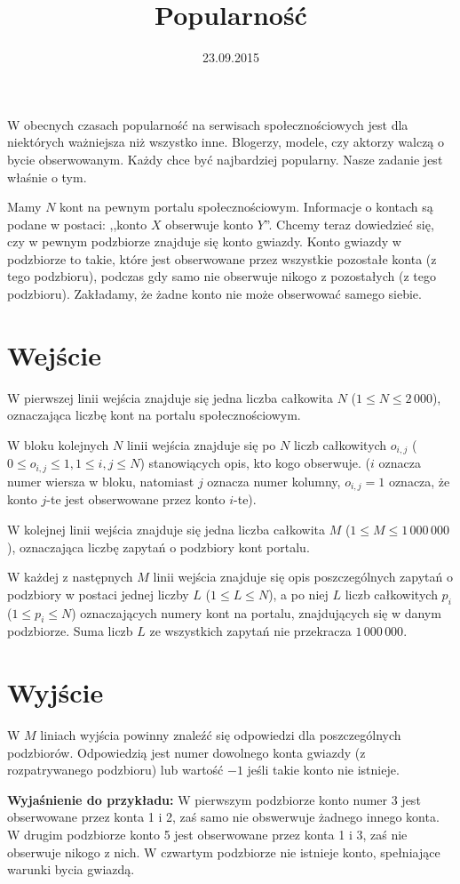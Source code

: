 \documentclass[zad,zawodnik,utf8]{sinol}
\title{Popularność}
\author{}
\date{23.09.2015}
\begin{document}
  \begin{tasktext}%
W obecnych czasach popularność na serwisach społecznościowych jest dla niektórych ważniejsza niż wszystko inne. Blogerzy, modele, czy aktorzy walczą o bycie obserwowanym. Każdy chce być najbardziej popularny. Nasze zadanie jest właśnie o tym.

Mamy $N$ kont na pewnym portalu społecznościowym. Informacje o kontach są podane w postaci: ,,konto $X$ obserwuje konto $Y$''. Chcemy teraz dowiedzieć się, czy w pewnym podzbiorze znajduje się konto gwiazdy. Konto gwiazdy w podzbiorze to takie, które jest obserwowane przez wszystkie pozostałe konta (z tego podzbioru), podczas gdy samo nie obserwuje nikogo z pozostałych (z tego podzbioru). Zakładamy, że żadne konto nie może obserwować samego siebie.

  \section{Wejście}
W pierwszej linii wejścia znajduje się jedna liczba całkowita $N$ ($1 \leq N \leq 2\,000$), oznaczająca liczbę kont na portalu społecznościowym.

W bloku kolejnych $N$ linii wejścia znajduje się po $N$ liczb całkowitych $o_{i,j}$ ($0 \leq o_{i,j} \leq 1, 1 \leq i, j \leq N$) stanowiących opis, kto kogo obserwuje. ($i$ oznacza numer wiersza w bloku, natomiast $j$ oznacza numer kolumny, $o_{i,j} = 1$ oznacza, że konto $j$-te jest obserwowane przez konto $i$-te).

W kolejnej linii wejścia znajduje się jedna liczba całkowita $M$ ($1 \leq M \leq 1\,000\,000$), oznaczająca liczbę zapytań o podzbiory kont portalu.

W każdej z następnych $M$ linii wejścia znajduje się opis poszczególnych zapytań o podzbiory w postaci jednej liczby $L$ ($1 \leq L \leq N$), a po niej $L$ liczb całkowitych $p_i$ ($1 \leq p_i \leq N$) oznaczających numery kont na portalu, znajdujących się w danym podzbiorze. Suma liczb $L$ ze wszystkich zapytań nie przekracza $1\,000\,000$.
 
  \section{Wyjście}
W $M$ liniach wyjścia powinny znaleźć się odpowiedzi dla poszczególnych podzbiorów. Odpowiedzią jest numer dowolnego konta gwiazdy (z rozpatrywanego podzbioru) lub wartość $-1$ jeśli takie konto nie istnieje.

     \makecompactexample

	\medskip
	\noindent
	\textbf{Wyjaśnienie do przykładu:} W pierwszym podzbiorze konto numer 3 jest obserwowane przez konta 1 i 2, zaś samo nie obswerwuje żadnego innego konta. W drugim podzbiorze konto 5 jest obserwowane przez konta 1 i 3, zaś nie obserwuje nikogo z nich. W czwartym podzbiorze nie istnieje konto, spełniające warunki bycia gwiazdą. 

  \end{tasktext}
\end{document}
